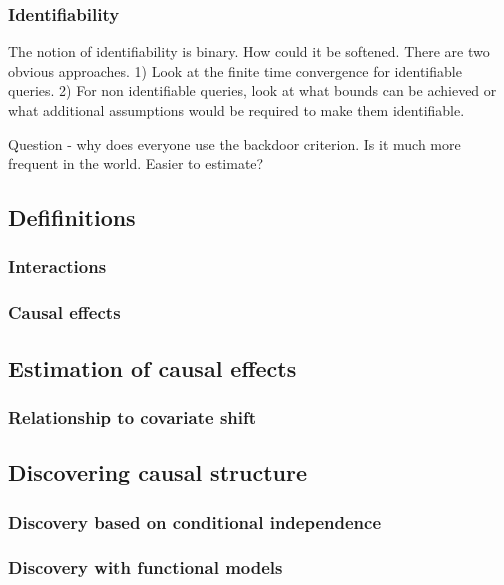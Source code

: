 \documentclass[11pt,a4paper]{book}
\begin{document}
\subsubsection*{Identifiability}

The notion of identifiability is binary. How could it be softened. There are two obvious approaches. 
1) Look at the finite time convergence for identifiable queries.
2) For non identifiable queries, look at what bounds can be achieved or what additional assumptions would be required to make them identifiable. 

Question - why does everyone use the backdoor criterion. Is it much more frequent in the world. Easier to estimate? 

\subsection*{Defifinitions}
\subsubsection*{Interactions}
\subsubsection*{Causal effects}

\subsection*{Estimation of causal effects}

\subsubsection*{Relationship to covariate shift}

\subsection*{Discovering causal structure}

\subsubsection*{Discovery based on conditional independence}

\subsubsection*{Discovery with functional models}
\end{document}
